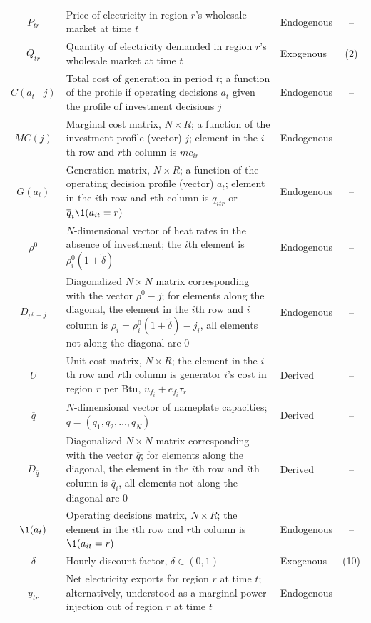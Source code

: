 \begin{center}
\begin{longtable}{c L{0.55\textwidth} C{0.15\textwidth} c}
    $P_{tr}$ & Price of electricity in region $r$'s wholesale market at time $t$ & Endogenous & -- \\
    $Q_{tr}$ & Quantity of electricity demanded in region $r$'s wholesale market at time $t$ & Exogenous &  (2) \\
    $C(a_t\mid j)$ & Total cost of generation in period $t$; a function of the profile if operating decisions $a_t$ given the profile of investment decisions $j$ & Endogenous & -- \\
    $MC(j)$ & Marginal cost matrix, $N \times R$; a function of the investment profile (vector) $j$; element in the $i$th row and $r$th column is $mc_{ir}$ & Endogenous & -- \\
    $G(a_t)$ & Generation matrix, $N \times R$; a function of the operating decision profile (vector) $a_t$; element in the $i$th row and $r$th column is $q_{itr}$ or $\overline{q}_i \1(a_{it} = r)$ & Endogenous & --\\
    $\rho^0$ & $N$-dimensional vector of heat rates in the absence of investment; the $i$th element is $\rho_i^0(1 + \tilde{\delta})$ & Endogenous & -- \\
    $D_{\rho^0 - j}$ & Diagonalized $N\times N$ matrix corresponding with the vector $\rho^0 - j$; for elements along the diagonal, the element in the $i$th row and $i$ column is $\rho_i = \rho_i^0(1 + \tilde{\delta}) - j_i$, all elements not along the diagonal are 0 & Endogenous & -- \\
    $U$ & Unit cost matrix, $N\times R$; the element in the $i$th row and $r$th column is generator $i$'s cost in region $r$ per Btu, $u_{f_i} + e_{f_i}\tau_r$ & Derived & -- \\
    $\overline{q}$ & $N$-dimensional vector of nameplate capacities; $\overline{q} = (\overline{q}_1, \overline{q}_2, \ldots, \overline{q}_N)$ & Derived & -- \\
    $D_{\overline{q}}$ & Diagonalized $N\times N$ matrix corresponding with the vector $\overline{q}$; for elements along the diagonal, the element in the $i$th row and $i$th column is $\overline{q}_i$, all elements not along the diagonal are 0 & Derived & -- \\
    $\1(a_t)$ & Operating decisions matrix, $N \times R$; the element in the $i$th row and $r$th column is $\1(a_{it} = r)$ & Endogenous & -- \\
    $\delta$ & Hourly discount factor, $\delta \in (0, 1)$ & Exogenous & (10)\\
    $y_{tr}$ & Net electricity exports for region $r$ at time $t$; alternatively, understood as a marginal power injection out of region $r$ at time $t$ & Endogenous & -- \\

\end{longtable}
\end{center}
